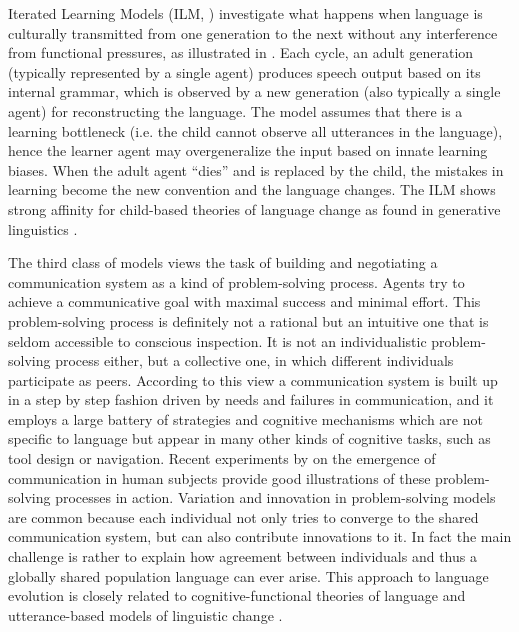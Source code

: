  Iterated Learning Models (ILM, \citealt{brighton05cultural, kirby01spontaneous, kirby02emergence, kirby04from, smith03iterated}) investigate what happens when language is culturally transmitted from one generation to the next without any interference from functional pressures, as illustrated in . Each cycle, an adult generation (typically represented by a single agent) produces speech output based on its internal grammar, which is observed by a new generation (also typically a single agent) for reconstructing the language. The model assumes that there is a learning bottleneck (i.e. the child cannot observe all utterances in the language), hence the learner agent may overgeneralize the input based on innate learning biases. When the adult agent ``dies'' and is replaced by the child, the mistakes in learning become the new convention and the language changes. The ILM shows strong affinity for child-based theories of language change as found in generative linguistics \citep{king69historical}.

The third class of models views the task of building and negotiating a communication system as a kind of problem-solving process. Agents try to achieve a communicative goal with maximal success and minimal effort. This problem-solving process is definitely not a rational but an intuitive one that is seldom accessible to conscious inspection. It is not an individualistic problem-solving process either, but a collective one, in which different individuals participate as peers. According to this view a communication system is built up in a step by step fashion driven by needs and failures in communication, and it employs a large battery of strategies and cognitive mechanisms which are not specific to language but appear in many other kinds of cognitive tasks, such as tool design or navigation. Recent experiments by \citet{galantucci05experimental} on the emergence of communication in human subjects provide good illustrations of these problem-solving processes in action. Variation and innovation in problem-solving models are common because each individual not only tries to converge to the shared communication system, but can also contribute innovations to it. In fact the main challenge is rather to explain how agreement between individuals and thus a globally shared population language can ever arise. This approach to language evolution is closely related to cognitive-functional theories of language and utterance-based models of linguistic change \citep{croft00explaining, croft05relevance}.

